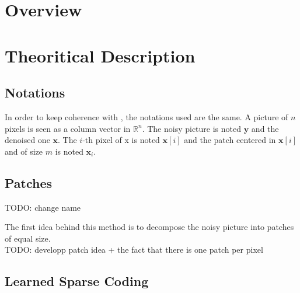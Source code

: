 \documentclass{ipol}
\newcommand{\psize}{m}
\newcommand{\denoi}{\textbf{x}}
\newcommand{\noi}{\textbf{y}}
\newcommand{\Rn}{\mathbb{R}^n}
\begin{document}
\begin{abstract}

\end{abstract} 

\section{Overview}


\section{Theoritical Description}

\subsection{ Notations}

In order to keep coherence with \cite{LSSC}, the notations used are the same.
A picture of $n$ pixels is seen as a column vector in $\Rn$. The noisy picture is noted $\noi$ and the denoised one $\denoi$. The $i$-th pixel of x is noted $\denoi[i]$ and the patch centered in $\denoi[i]$ and of size $\psize$ is noted $\denoi_i$.

\subsection{ Patches }
TODO: change name

The first idea behind this method is to decompose the noisy picture into patches of equal size. \\
TODO: developp patch idea + the fact that there is one patch per pixel\\

\subsection{ Learned Sparse Coding}
\end{document}
